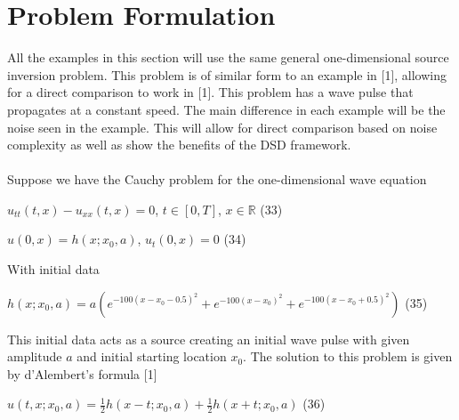 \documentclass[botnum, fleqn]{unmeethesis}
\begin{document}
\section{\label{section:Problem Formulation}Problem Formulation}
All the examples in this section will use the same general one-dimensional source inversion problem. This problem is of similar form to an example in [1], allowing for a direct comparison to work in [1]. This problem has a wave pulse that propagates at a constant speed. The main  difference in each example will be the noise seen in the example. This will allow for direct comparison based on noise complexity as well as show the benefits of the DSD framework. \\\\

Suppose we have the Cauchy problem for the one-dimensional wave equation

\hspace{\fill}$u_{tt}(t,x)-u_{xx}(t,x)=0$, \hspace{1cm} $t\in [0,T]$, \hspace{1cm} $x\in \mathbb{R}$\hspace{\fill} \normalsize(33) 

\hspace{\fill}$u(0,x)=h(x;x_0,a)$, \hspace{1cm} $u_t(0,x)=0$\hspace{\fill} \normalsize (34)

With initial data

\hspace{\fill}$h(x;x_0,a)=a(e^{-100(x-x_0-0.5)^2}+e^{-100(x-x_0)^2}+e^{-100(x-x_0+0.5)^2})$\hspace{\fill} \normalsize (35)

This initial data acts as a source creating an initial wave pulse with given amplitude $a$ and initial starting location $x_0$. The solution to this problem is given by d'Alembert's formula [1]

\hspace{\fill}$u(t,x;x_0,a)=\frac{1}{2}h(x-t;x_0,a)+\frac{1}{2}h(x+t;x_0,a)$\hspace{\fill} \normalsize (36)
\end{document}
